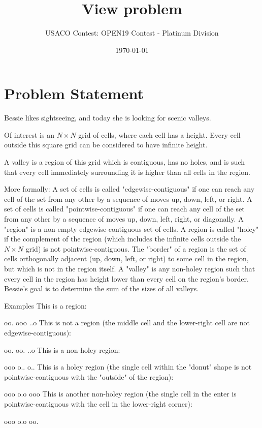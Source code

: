 \documentclass[12pt]{article}
\title{View problem}
\author{USACO Contest: OPEN19 Contest - Platinum Division}
\date{\today}
\begin{document}
\maketitle

\section*{Problem Statement}

Bessie likes sightseeing, and today she is looking for scenic valleys.

Of interest is an $N \times N$ grid of cells, where each cell has a height.
Every cell outside this square grid can be considered to have infinite height.

A valley is a region of this grid which is contiguous, has no holes, and is such
that every cell immediately surrounding it is higher than all cells in the
region.

More formally:
 A set of cells is called "edgewise-contiguous" if one can reach any cell of
the set from any other by a sequence of moves up, down, left, or right. A set of cells is called "pointwise-contiguous" if one can reach any cell
of the set from any other by a sequence of moves up, down, left, right, or
diagonally. A "region" is a non-empty edgewise-contiguous set of
cells.  A region is called "holey" if the complement of the region
(which includes the infinite cells outside the $N \times N$ grid) is not
pointwise-contiguous.  The "border" of a region is the set of cells
orthogonally adjacent (up, down,   left, or right) to some cell  in the region,
but which is not in the region itself.  A "valley" is any non-holey
region such that every cell in the region has height lower than every cell on
the region's border.
Bessie's goal is to determine the sum of the sizes of all valleys.

Examples
This is a region:

oo.
ooo
..o
This is not a region (the middle cell and the lower-right cell are not
edgewise-contiguous):

oo.
oo.
..o
This is a non-holey region:

ooo
o..
o..
This is a holey region (the single cell within the "donut" shape is not
pointwise-contiguous with the "outside" of the region):

ooo
o.o
ooo
This is another non-holey region (the single cell in the enter is
pointwise-contiguous with the cell in the lower-right corner):

ooo
o.o
oo.
\end{document}
